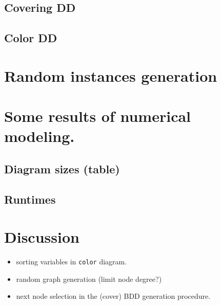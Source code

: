 \documentclass[11pt]{article}
\begin{document}
\subsection{Covering DD}
\label{sec:orge4cdf4e}

\subsection{Color DD}
\label{sec:orgf80870e}

\section{Random instances generation}
\label{sec:org680cb5b}

\section{Some results of numerical modeling.}
\label{sec:orgc5d5017}

\subsection{Diagram sizes (table)}
\label{sec:org3625a65}

\subsection{Runtimes}
\label{sec:org7e85580}

\section{Discussion}
\label{sec:orgda304c8}
\begin{itemize}
\item sorting variables in \texttt{color} diagram.
\item random graph generation (limit node degree?)
\item next node selection in the (cover) BDD generation procedure.
\end{itemize}
\end{document}
